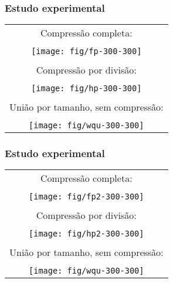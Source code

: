 \documentclass{beamer}
\begin{document}
\begin{frame}
\frametitle{Estudo experimental}

\begin{center}
\begin{tabular}[t]{c}
Compressão completa: \\
\\
\texttt{[image: fig/fp-300-300]} \\
\\
Compressão por divisão: \\
\\
\texttt{[image: fig/hp-300-300]} \\
\\
União por tamanho, sem compressão: \\
\\
\texttt{[image: fig/wqu-300-300]}
\end{tabular}
\end{center}

\end{frame}

\begin{frame}
\frametitle{Estudo experimental}

\begin{center}
\begin{tabular}[t]{c}
Compressão completa: \\
\\
\texttt{[image: fig/fp2-300-300]} \\
\\
Compressão por divisão: \\
\\
\texttt{[image: fig/hp2-300-300]} \\
\\
União por tamanho, sem compressão: \\
\\
\texttt{[image: fig/wqu-300-300]}
\end{tabular}
\end{center}

\end{frame}
\end{document}
